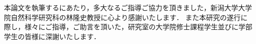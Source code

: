 \documentclass[a4paper,11pt]{jreport}
\begin{document}
\begin{gratitude}

本論文を執筆するにあたり，多大なるご指導ご協力を頂きました，新潟大学大学院自然科学研究科の林隆史教授に心より感謝いたします．
また本研究の遂行に際し，様々にご指導，ご助言を頂いた，研究室の大学院修士課程学生並びに学部学生の皆様に深謝いたします．

\end{gratitude}



\end{document}
